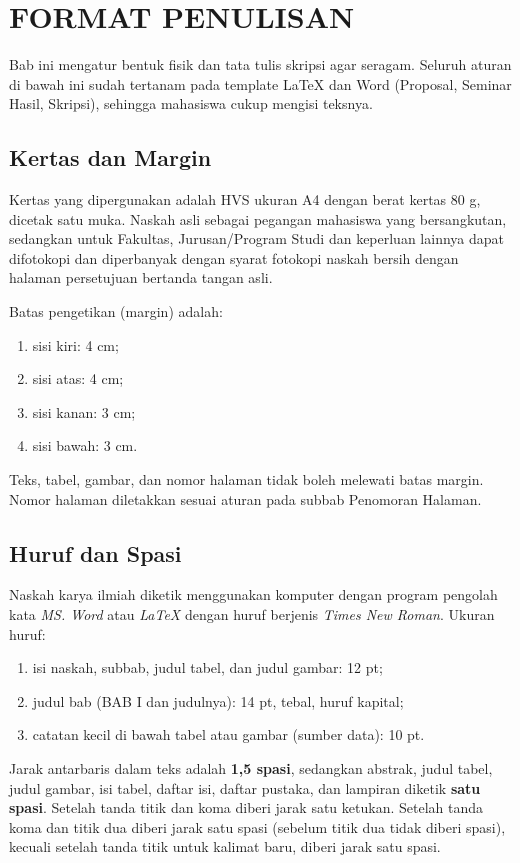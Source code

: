 \chapter{FORMAT PENULISAN}

Bab ini mengatur bentuk fisik dan tata tulis skripsi agar seragam. Seluruh aturan di bawah ini sudah tertanam pada template LaTeX dan Word (Proposal, Seminar Hasil, Skripsi), sehingga mahasiswa cukup mengisi teksnya.

\section{Kertas dan Margin}
Kertas yang dipergunakan adalah HVS ukuran A4 dengan berat kertas 80 g, dicetak satu muka. Naskah asli sebagai pegangan mahasiswa yang bersangkutan, sedangkan untuk Fakultas, Jurusan/Program Studi dan keperluan lainnya dapat difotokopi dan diperbanyak dengan syarat fotokopi naskah bersih dengan halaman persetujuan bertanda tangan asli.

Batas pengetikan (margin) adalah:
\begin{enumerate}
\item sisi kiri: 4 cm;
\item sisi atas: 4 cm;
\item sisi kanan: 3 cm;
\item sisi bawah: 3 cm.
\end{enumerate}
Teks, tabel, gambar, dan nomor halaman tidak boleh melewati batas margin. Nomor halaman diletakkan sesuai aturan pada subbab Penomoran Halaman.

\section{Huruf dan Spasi}
Naskah karya ilmiah diketik menggunakan komputer dengan program pengolah kata \textit{MS. Word} atau \textit{LaTeX} dengan huruf berjenis \textit{Times New Roman}. Ukuran huruf:
\begin{enumerate}
\item isi naskah, subbab, judul tabel, dan judul gambar: 12 pt;
\item judul bab (BAB I dan judulnya): 14 pt, tebal, huruf kapital;
\item catatan kecil di bawah tabel atau gambar (sumber data): 10 pt.
\end{enumerate}
Jarak antarbaris dalam teks adalah \textbf{1,5 spasi}, sedangkan abstrak, judul tabel, judul gambar, isi tabel, daftar isi, daftar pustaka, dan lampiran diketik \textbf{satu spasi}. Setelah tanda titik dan koma diberi jarak satu ketukan. Setelah tanda koma dan titik dua diberi jarak satu spasi (sebelum titik dua tidak diberi spasi), kecuali setelah tanda titik untuk kalimat baru, diberi jarak satu spasi.

